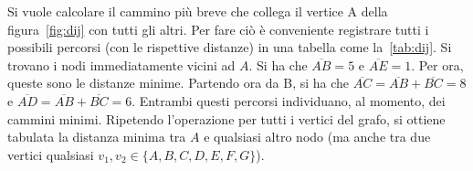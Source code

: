 Si vuole calcolare il cammino più breve che collega il vertice A della figura~\ref{fig:dij} con tutti gli altri. Per fare ciò è conveniente registrare tutti i possibili percorsi (con le rispettive distanze) in una tabella come la~\ref{tab:dij}. Si trovano i nodi immediatamente vicini ad $A$. Si ha che $\overline{AB}=5$ e $\overline{AE}=1$. Per ora, queste sono le distanze minime. Partendo ora da B, si ha che $\overline{AC}=\overline{AB}+\overline{BC}=8$ e $\overline{AD}=\overline{AB}+\overline{BC}=6$. Entrambi questi percorsi individuano, al momento, dei cammini minimi. Ripetendo l'operazione per tutti i vertici del grafo, si ottiene tabulata la distanza minima tra $A$ e qualsiasi altro nodo (ma anche tra due vertici qualsiasi $v_1,v_2\in\{A, B, C, D, E, F, G\}$).
\begin{figure}
	\centering
\end{figure}
